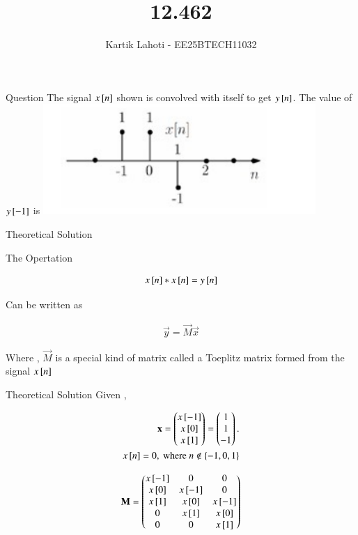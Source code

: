 \documentclass{beamer}
\title %
{12.462}
\author 
{Kartik Lahoti - EE25BTECH11032}
\begin{document}
\frame{\titlepage}
\begin{frame}{Question}
The signal $x{}\left[n\right]$ shown  is convolved with itself to get $y{}\left[n\right]$. The value of $y{}\left[-1\right]$ is 
    \centering
    \includegraphics[width=\columnwidth, height=0.8\textheight, keepaspectratio]{../figs/q1.png}
\end{frame}

\begin{frame}{Theoretical Solution}

The Opertation 

\begin{align}
    x{}\left[n\right] * x{}\left[n\right] = y{}\left[n\right] 
\end{align}

Can be written as 

\begin{align}
    \vec{y} = \vec{M}\vec{x}
\end{align}

Where , $\vec{M}$ is a special kind of matrix called a Toeplitz matrix formed from the signal $x{}\left[n\right]$

\end{frame}

\begin{frame}{Theoretical Solution}
Given , 

\begin{align}
    \mathbf{x} = \begin{pmatrix}x{}\left[-1\right]\\x{}\left[0\right]\\x{}\left[1\right]\end{pmatrix} = \begin{pmatrix}1\\1\\-1\end{pmatrix}. \\x{}\left[n\right] = 0 , \text{ where } n \notin \left\{-1,0,1\right\}
\end{align}

\begin{align}
    \mathbf{M} = \begin{pmatrix}x{}\left[-1\right]&0&0\\x{}\left[0\right]&x{}\left[-1\right]&0\\x{}\left[1\right]&x{}\left[0\right]&x{}\left[-1\right]\\0&x{}\left[1\right]&x{}\left[0\right]\\0&0&x{}\left[1\right]\end{pmatrix}
\end{align}
\end{frame}
\end{document}
